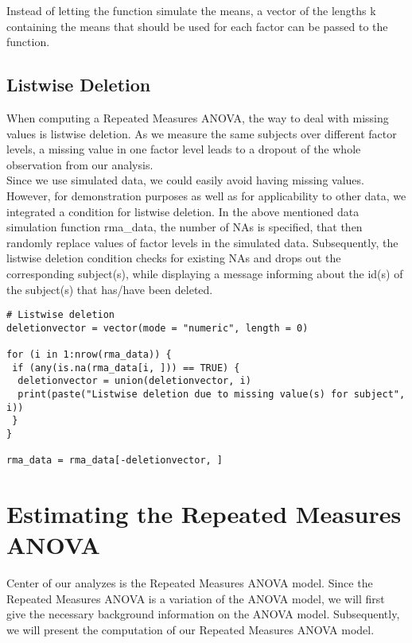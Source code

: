 \documentclass[11pt]{article}
\begin{document}
				 Instead of letting the function simulate the means, a vector of the lengths k containing the means that should be used for each factor can be passed to the function.   
				 
		\subsection{Listwise Deletion}
				 When computing a Repeated Measures ANOVA, the way to deal with missing values is listwise deletion. As we measure the same subjects over different factor levels, a missing value in one factor level leads to a dropout of the whole observation from our analysis.\\
				
				Since we use simulated data, we could easily avoid having missing values. However, for demonstration purposes as well as for applicability to other data, we integrated a condition for listwise deletion. In the above mentioned data simulation function rma\_data, the number of NAs is specified, that then randomly replace values of factor levels in the simulated data. Subsequently, the listwise deletion condition checks for existing NAs and drops out the corresponding subject(s), while displaying a message informing about the id(s) of the subject(s) that has/have been deleted.\\
				
\begin{lstlisting}
# Listwise deletion
deletionvector = vector(mode = "numeric", length = 0)
				
for (i in 1:nrow(rma_data)) {
 if (any(is.na(rma_data[i, ])) == TRUE) {
  deletionvector = union(deletionvector, i)
  print(paste("Listwise deletion due to missing value(s) for subject", i))
 }
}
				
rma_data = rma_data[-deletionvector, ]
\end{lstlisting}
				 
				
		
						
	\section{Estimating the Repeated Measures ANOVA} 
				 Center of our analyzes is the Repeated Measures ANOVA model. Since the Repeated Measures ANOVA is a variation of the ANOVA model, we will first give the necessary background information on the ANOVA model. Subsequently, we will present the computation of our Repeated Measures ANOVA model.
		
\end{document}
